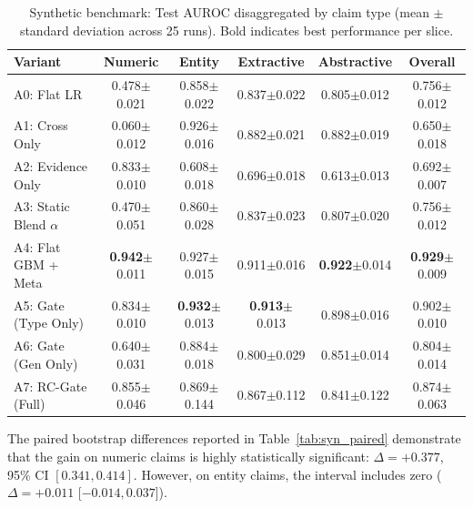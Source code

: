 \documentclass[pdflatex,sn-mathphys,Numbered]{sn-jnl}
\begin{document}
\begin{table}[htbp]
\caption{Synthetic benchmark: Test AUROC disaggregated by claim type (mean $\pm$ standard deviation across 25 runs). Bold indicates best performance per slice.}\label{tab:syn_type}
\footnotesize
\setlength{\tabcolsep}{3.5pt}
\begin{tabular}{@{}lccccc@{}}
\toprule
\textbf{Variant} & \textbf{Numeric} & \textbf{Entity} & \textbf{Extractive} & \textbf{Abstractive} & \textbf{Overall} \\
\midrule
A0: Flat LR & 0.478$\pm$0.021 & 0.858$\pm$0.022 & 0.837$\pm$0.022 & 0.805$\pm$0.012 & 0.756$\pm$0.012 \\
A1: Cross Only & 0.060$\pm$0.012 & 0.926$\pm$0.016 & 0.882$\pm$0.021 & 0.882$\pm$0.019 & 0.650$\pm$0.018 \\
A2: Evidence Only & 0.833$\pm$0.010 & 0.608$\pm$0.018 & 0.696$\pm$0.018 & 0.613$\pm$0.013 & 0.692$\pm$0.007 \\
A3: Static Blend $\alpha$ & 0.470$\pm$0.051 & 0.860$\pm$0.028 & 0.837$\pm$0.023 & 0.807$\pm$0.020 & 0.756$\pm$0.012 \\
A4: Flat GBM + Meta & \textbf{0.942}$\pm$0.011 & 0.927$\pm$0.015 & 0.911$\pm$0.016 & \textbf{0.922}$\pm$0.014 & \textbf{0.929}$\pm$0.009 \\
A5: Gate (Type Only) & 0.834$\pm$0.010 & \textbf{0.932}$\pm$0.013 & \textbf{0.913}$\pm$0.013 & 0.898$\pm$0.016 & 0.902$\pm$0.010 \\
A6: Gate (Gen Only) & 0.640$\pm$0.031 & 0.884$\pm$0.018 & 0.800$\pm$0.029 & 0.851$\pm$0.014 & 0.804$\pm$0.014 \\
A7: RC-Gate (Full) & 0.855$\pm$0.046 & 0.869$\pm$0.144 & 0.867$\pm$0.112 & 0.841$\pm$0.122 & 0.874$\pm$0.063 \\
\bottomrule
\end{tabular}
\end{table}

The paired bootstrap differences reported in Table~\ref{tab:syn_paired} demonstrate that the gain on numeric claims is highly statistically significant: $\Delta = +0.377$, 95\% CI $[0.341, 0.414]$. However, on entity claims, the interval includes zero ($\Delta = +0.011$ [$-0.014, 0.037$]).
\end{document}
